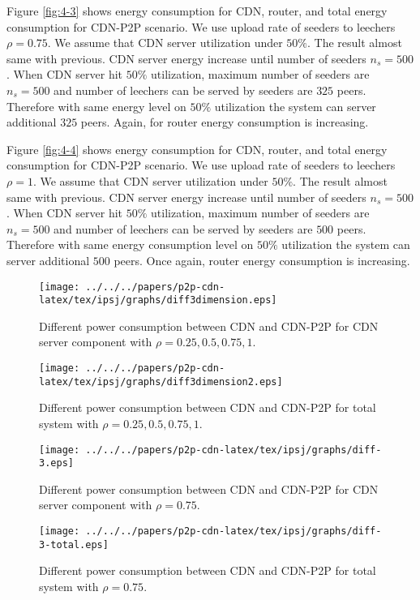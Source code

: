 Figure \ref{fig:4-3} shows energy consumption for CDN, router, and total energy consumption for CDN-P2P scenario.  
We use upload rate of seeders to leechers $\rho=0.75$.
We assume that CDN server utilization under $50\%$.
The result almost same with previous. 
CDN server energy increase until number of seeders $n_s=500$.
When CDN server hit $50\%$ utilization, maximum number of seeders are $n_s=500$ and number of leechers can be served by seeders are $325$ peers. 
Therefore with same energy level on $50\%$ utilization the system can server additional $325$ peers. 
Again, for router energy consumption is increasing. 

Figure \ref{fig:4-4} shows energy consumption for CDN, router, and total energy consumption for CDN-P2P scenario.  
We use upload rate of seeders to leechers $\rho=1$.
We assume that CDN server utilization under $50\%$.
The result almost same with previous. 
CDN server energy increase until number of seeders $n_s=500$.
When CDN server hit $50\%$ utilization, maximum number of seeders are $n_s=500$ and number of leechers can be served by seeders are $500$ peers. 
Therefore with same energy consumption level on $50\%$ utilization the system can server additional $500$ peers. 
Once again, router energy consumption is increasing. 


\begin{figure*}[ht]
\centering
\begin{minipage}[b]{0.4\linewidth}
	\texttt{[image: ../../../papers/p2p-cdn-latex/tex/ipsj/graphs/diff3dimension.eps]}
	\caption{Different power consumption between CDN and CDN-P2P for CDN server component with $\rho=0.25,0.5,0.75,1$.}
	\label{fig:diff1}
\end{minipage}
\hfill
\begin{minipage}[b]{0.4\linewidth}
	\texttt{[image: ../../../papers/p2p-cdn-latex/tex/ipsj/graphs/diff3dimension2.eps]}
	\caption{Different power consumption between CDN and CDN-P2P for total system with $\rho=0.25,0.5,0.75,1$.}
	\label{fig:diff2}
\end{minipage}
\centering
\begin{minipage}[b]{0.4\linewidth}
	\texttt{[image: ../../../papers/p2p-cdn-latex/tex/ipsj/graphs/diff-3.eps]}
	\caption{Different power consumption between CDN and CDN-P2P for CDN server component with $\rho=0.75$.}
	\label{fig:diffs1}
\end{minipage}
\hfill
\begin{minipage}[b]{0.4\linewidth}
	\texttt{[image: ../../../papers/p2p-cdn-latex/tex/ipsj/graphs/diff-3-total.eps]}
	\caption{Different power consumption between CDN and CDN-P2P for total system with $\rho=0.75$.}
	\label{fig:diffs2}
\end{minipage}
\label{fig:maindiff}
\end{figure*}

